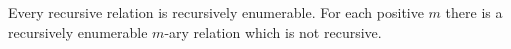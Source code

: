 Every recursive relation is recursively enumerable. For each positive $m$ there is a recursively enumerable $m$-ary relation which is not recursive.
